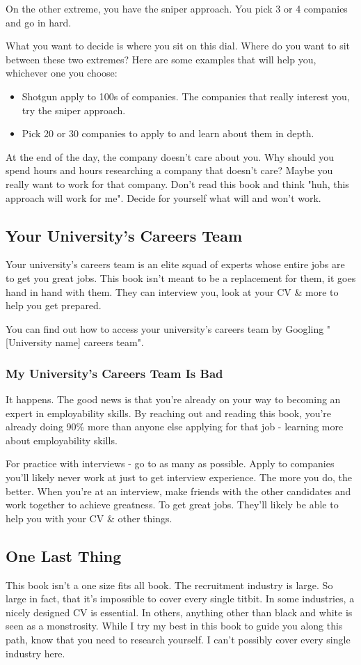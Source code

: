 \documentclass{article}
\begin{document}
On the other extreme, you have the sniper approach. You pick 3 or 4
companies and go in hard.

What you want to decide is where you sit on this dial. Where do you want
to sit between these two extremes? Here are some examples that will help
you, whichever one you choose:

\begin{itemize}
\item
  Shotgun apply to 100s of companies. The companies that really interest
  you, try the sniper approach.
\item
  Pick 20 or 30 companies to apply to and learn about them in depth. 
\end{itemize}
At the end of the day, the company doesn't care about you. Why should
you spend hours and hours researching a company that doesn't care? Maybe
you really want to work for that company. Don't read this book and think
"huh, this approach will work for me". Decide for yourself what will
and won't work.

\subsection{Your University's Careers Team}
Your university's careers team is an elite squad of experts whose entire
jobs are to get you great jobs. This book isn't meant to be a
replacement for them, it goes hand in hand with them. They can interview
you, look at your CV \& more to help you get prepared.

You can find out how to access your university's careers team by
Googling "[University name] careers team".
\subsubsection{My University's Careers Team Is Bad}
It happens. The good news is that you're already on your way to becoming
an expert in employability skills. By reaching out and reading this
book, you're already doing 90\% more than anyone else applying for that
job - learning more about employability skills.

For practice with interviews - go to as many as possible. Apply to
companies you'll likely never work at just to get interview experience.
The more you do, the better. When you're at an interview, make friends
with the other candidates and work together to achieve greatness. To get
great jobs. They'll likely be able to help you with your CV \& other
things.
\subsection{One Last Thing}
This book isn't a one size fits all book. The recruitment industry is
large. So large in fact, that it's impossible to cover every single
titbit. In some industries, a nicely designed CV is essential. In
others, anything other than black and white is seen as a monstrosity.
While I try my best in this book to guide you along this path, know that
you need to research yourself. I can't possibly cover every single
industry here.
\newpage
\end{document}
